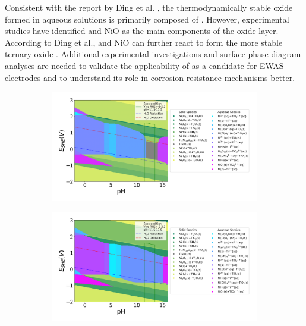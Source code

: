 \documentclass[journal=jacsat,manuscript=article]{achemso}
\begin{document}
Consistent with the report by Ding et al. \cite{Ding2018ElectrochemicalStates}, the thermodynamically stable oxide formed in aqueous solutions is primarily composed of . However, experimental studies \cite{Huang2005SurfaceAcidity, Clarke2006InfluenceRelease, Carroll2003CorrosionEnvironments} have identified  and NiO as the main components of the oxide layer. According to Ding et al.,  and NiO can further react to form the more stable ternary oxide . Additional experimental investigations and surface phase diagram analyses are needed to validate the applicability of  as a candidate for EWAS electrodes and to understand its role in corrosion resistance mechanisms better.

\begin{figure}[htbp]
    \centering
    \begin{subfigure}[b]{0.45\textwidth}
        \label{fig:TiNi_Pourbaix_NH3_Gly}
        \includegraphics[width=\textwidth]
        {Figures/alloy_pourbaix_diagrams/Ti_Ni_alloy_Ti0.5 Ni0.5_NH3=0.02M_Gly=0.005M_CN=0M_activity=1e-04M.png}
    \end{subfigure}
    \begin{subfigure}[b]{0.45\textwidth}
        \label{fig:TiNi_Pourbaix_NH3_Gly_CN}
        \includegraphics[width=\textwidth]{Figures/alloy_pourbaix_diagrams/Ti_Ni_alloy_Ti0.5 Ni0.5_NH3=0.02M_Gly=0.005M_CN=0.0001M_activity=1e-04M.png}

\end{subfigure}
\end{figure}
\end{document}
